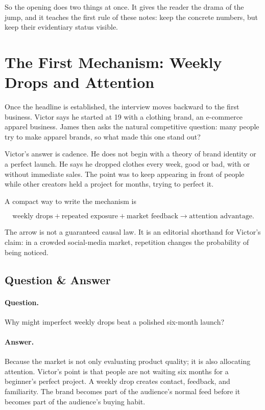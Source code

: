 So the opening does two things at once. It gives the reader the drama of the jump, and it teaches the first rule of these notes: keep the concrete numbers, but keep their evidentiary status visible.

\section{The First Mechanism: Weekly Drops and Attention}

Once the headline is established, the interview moves backward to the first business. Victor says he started at 19 with a clothing brand, an e-commerce apparel business. James then asks the natural competitive question: many people try to make apparel brands, so what made this one stand out?

Victor's answer is cadence. He does not begin with a theory of brand identity or a perfect launch. He says he dropped clothes every week, good or bad, with or without immediate sales. The point was to keep appearing in front of people while other creators held a project for months, trying to perfect it.

A compact way to write the mechanism is

\begin{equation}
\text{weekly drops}
+
\text{repeated exposure}
+
\text{market feedback}
\longrightarrow
\text{attention advantage}.
\end{equation}

The arrow is not a guaranteed causal law. It is an editorial shorthand for Victor's claim: in a crowded social-media market, repetition changes the probability of being noticed.

\subsection{Question \& Answer}

\paragraph{Question.}
Why might imperfect weekly drops beat a polished six-month launch?

\paragraph{Answer.}
Because the market is not only evaluating product quality; it is also allocating attention. Victor's point is that people are not waiting six months for a beginner's perfect project. A weekly drop creates contact, feedback, and familiarity. The brand becomes part of the audience's normal feed before it becomes part of the audience's buying habit.

